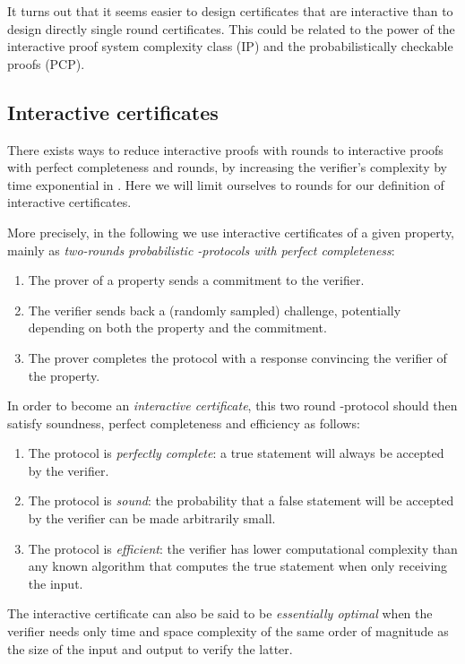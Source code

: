 \documentclass{article}
\begin{document}
It turns out that it seems easier to design certificates that are interactive
than to design directly single round certificates. This could be related to the
power of the interactive proof system complexity class (IP) and the
probabilistically checkable proofs (PCP).

\subsection{Interactive certificates}\label{ssec:intcert}
 
There exists ways to reduce interactive proofs with  rounds to interactive
proofs with perfect completeness and  rounds,
by increasing the verifier's complexity by time exponential in .
Here we will limit ourselves to  rounds
for our definition of interactive certificates. 

More precisely, in the following we use interactive certificates of a given
property, mainly as  {\em two-rounds probabilistic -protocols with perfect completeness}: 
\begin{enumerate}
\item The prover of a property sends a commitment to the verifier.
\item The verifier sends back a (randomly sampled) challenge, potentially
  depending on both the property and the commitment.
\item The prover completes the protocol with a response convincing
  the verifier of the property.
\end{enumerate}
In order to become an {\em interactive certificate}, this two round
-protocol should then satisfy soundness, perfect completeness and
efficiency as follows: 
\begin{enumerate}\renewcommand {\theenumi}{\roman{enumi}}
\item The protocol is {\em perfectly complete}: a true statement will always be
  accepted by the verifier.
\item The protocol is {\em sound}: the probability that a false statement will
  be accepted by the verifier can be made arbitrarily small.
\item The protocol is {\em efficient}: the verifier has lower computational
  complexity than any known algorithm that computes the true statement when only receiving the input.
\end{enumerate}

The interactive certificate can also be said to be {\em essentially optimal}
when the verifier needs only time and space complexity of the same order of
magnitude as the size of the input and output to verify the latter.
\end{document}

